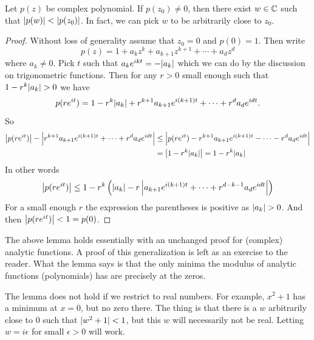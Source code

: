 \begin{lemma} \label{lemma:polyalwaysgetssmaller}
Let $p(z)$ be complex polynomial.  If $p(z_0) \not= 0$, then there
exist $w \in {\mathbb{C}}$ such that $\lvert {p(w)} \rvert < \lvert {p(z_0)} \rvert$.  In fact,
we can pick $w$ to be arbitrarily close to $z_0$.
\end{lemma}

\begin{proof}
Without loss of generality assume that $z_0 = 0$ and $p(0) = 1$.  Then write
\begin{equation*}
p(z) = 1+a_kz^k + a_{k+1}z^{k+1} + \cdots + a_d z^d
\end{equation*}
where $a_k \not= 0$.  Pick $t$ such that $a_k e^{ikt} = -\lvert {a_k} \rvert$ which
we can do by the discussion on trigonometric functions.  Then for
any $r > 0$ small enough such that
$1-r^k \lvert {a_k} \rvert > 0$ we have
\begin{equation*}
p(r e^{it}) =
1-r^k \lvert {a_k} \rvert + r^{k+1}a_{k+1}e^{i(k+1)t} + \cdots + r^{d}a_{d}e^{idt} .
\end{equation*}
So
\begin{equation*}
\begin{split}
\left\lvert {
p(r e^{it}) } \right\rvert - \left\lvert {
r^{k+1}a_{k+1}e^{i(k+1)t} + \cdots + r^{d}a_{d}e^{idt}
} \right\rvert
& \leq
\left\lvert {
p(r e^{it}) 
- r^{k+1}a_{k+1}e^{i(k+1)t} - \cdots - r^{d}a_{d}e^{idt}
} \right\rvert
\\
& =
\left\lvert {
1-r^k \lvert {a_k} \rvert
} \right\rvert
=
1-r^k \lvert {a_k} \rvert
\end{split}
\end{equation*}
In other words
\begin{equation*}
\left\lvert {
p(r e^{it}) } \right\rvert
\leq
1-r^k \left( \lvert {a_k} \rvert
-
r
\left\lvert {
a_{k+1}e^{i(k+1)t} + \cdots + r^{d-k-1}a_{d}e^{idt}
} \right\rvert
\right)
\end{equation*}
For a small enough $r$ the expression the parentheses is positive
as $\lvert {a_k} \rvert > 0$.  And then $\left\lvert {p(re^{it})} \right\rvert < 1 = p(0)$.
\end{proof}

\begin{remark}
The above lemma holds essentially with an unchanged proof for (complex) analytic
functions.  A proof of this generalization is left as an exercise to the reader.
What the lemma
says is that the only minima the modulus of analytic functions (polynomials)
has are precisely at the zeros.
\end{remark}

\begin{remark}
The lemma does not hold if we restrict to real numbers.  For
example, $x^2+1$ has a minimum at $x=0$, but no zero there.  The thing is that
there is a $w$ arbitrarily close to $0$ such that $\lvert {w^2+1} \rvert < 1$, but this
$w$ will necessarily not be real.  Letting $w = i\epsilon$ for small
$\epsilon > 0$ will work.
\end{remark}

